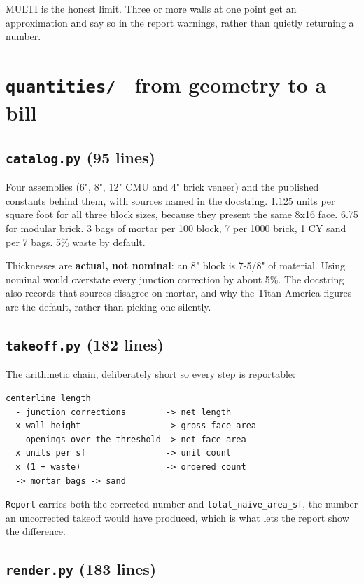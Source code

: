 \documentclass[11pt,letterpaper]{article}
\newcommand{\code}[1]{\texttt{\small #1}}
\begin{document}
MULTI is the honest limit. Three or more walls at one point get an
approximation and say so in the report warnings, rather than quietly
returning a number.

\section{\texttt{quantities/} \textendash\ from geometry to a bill}

\subsection{\texttt{catalog.py} (95 lines)}

Four assemblies (6", 8", 12" CMU and 4" brick veneer) and the published
constants behind them, with sources named in the docstring. 1.125 units per
square foot for all three block sizes, because they present the same 8x16
face. 6.75 for modular brick. 3 bags of mortar per 100 block, 7 per 1000
brick, 1 CY sand per 7 bags. 5\% waste by default.

Thicknesses are \textbf{actual, not nominal}: an 8" block is 7-5/8" of
material. Using nominal would overstate every junction correction by about
5\%. The docstring also records that sources disagree on mortar, and why the
Titan America figures are the default, rather than picking one silently.

\subsection{\texttt{takeoff.py} (182 lines)}

The arithmetic chain, deliberately short so every step is reportable:

\begin{lstlisting}[language=none]
centerline length
  - junction corrections        -> net length
  x wall height                 -> gross face area
  - openings over the threshold -> net face area
  x units per sf                -> unit count
  x (1 + waste)                 -> ordered count
  -> mortar bags -> sand
\end{lstlisting}

\code{Report} carries both the corrected number and
\code{total\_naive\_area\_sf}, the number an uncorrected takeoff would have
produced, which is what lets the report show the difference.

\subsection{\texttt{render.py} (183 lines)}
\end{document}

